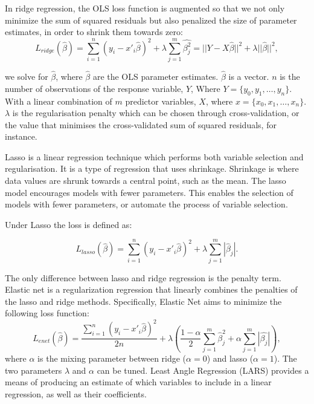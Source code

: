 In ridge regression, the OLS loss function is augmented so that we not only minimize the sum of squared residuals but also penalized the size of parameter estimates, in order to shrink them towards zero:
\begin{equation}
L_{ridge}(\hat{\beta})=\sum^n_{i=1}(y_i-x'_i\hat{\beta})^2+\lambda\sum^m_{j=1}\hat{\beta^2_j}=||Y-X\hat{\beta}||^2+\lambda||\hat{\beta}||^2,
\end{equation}

\noindent we solve for $\hat{\beta}$, where $\hat{\beta}$ are the OLS parameter estimates. $\hat{\beta}$  is a vector. $n$ is the number of observations of the response variable, $Y$, Where $Y=\{y_0, y_1, \ldots,y_n\}$. With a linear combination of $m$ predictor variables, $X$, where $x=\{x_0,x_1,\ldots,x_n\}$. $\lambda$ is the regularisation penalty which can be chosen through cross-validation, or the value that minimises the cross-validated sum of squared residuals, for instance.

Lasso is a linear regression technique which performs both variable selection and regularisation. It is a type of regression that uses shrinkage. Shrinkage is where data values are shrunk towards a central point, such as the mean. The lasso model encourages models with fewer parameters. This enables the selection of models with fewer parameters, or automate the process of variable selection.

Under Lasso the loss is defined as:

\begin{equation}
L_{lasso}(\hat{\beta})=\sum^n_{i=1}(y_i-x'_i\hat{\beta})^2+\lambda\sum^m_{j=1}|\hat{\beta}_j|.
\end{equation}

The only difference between lasso and ridge regression is the penalty term. Elastic net is a regularization regression that linearly combines the penalties of the lasso and ridge methods. Specifically, Elastic Net aims to minimize the following loss function:
\begin{equation}
L_{enet}(\hat{\beta})=\frac{\sum^n_{i=1}(y_i-x'_i\hat{\beta})^2}{2n}+\lambda(\frac{1-\alpha}{2}\sum^m_{j=1}\hat{\beta}^2_j+\alpha\sum^m_{j=1}|\hat{\beta_j}|),
\end{equation}
where $\alpha$ is the mixing parameter between ridge ($\alpha=0$) and lasso ($\alpha=1$). The two parameters $\lambda$ and $\alpha$ can be tuned. Least Angle Regression (LARS) provides a means of producing an estimate of which variables to include in a linear regression, as well as their coefficients.



